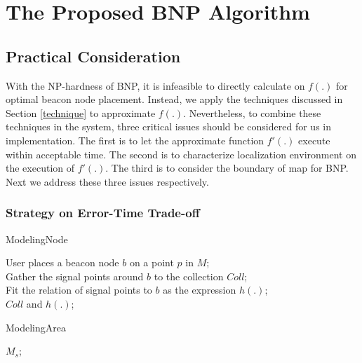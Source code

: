 \documentclass[10pt, conference, letterpaper]{IEEEtran}
\begin{document}
\vspace{0.3ex}

\section{The Proposed BNP Algorithm} \label{synthesize}
\subsection{Practical Consideration} \label{sys_consideration}
With the NP-hardness of BNP, it is infeasible to directly calculate on $f(.)$ for optimal beacon node placement. Instead, we apply the techniques discussed in Section \ref{technique} to approximate $f(.)$. Nevertheless, to combine these techniques in the system, three critical issues should be considered for us in implementation. The first is to let the approximate function $f'(.)$ execute within acceptable time. The second is to characterize localization environment on the execution of $f'(.)$. The third is to consider the boundary of map for BNP. Next we address these three issues respectively.

\subsubsection{Strategy on Error-Time Trade-off}

\begin{algorithm} \label{ModelingNode}
\caption{ModelingNode}
User places a beacon node $b$ on a point $p$ in $M$;\\
Gather the signal points around $b$ to the collection $Coll$;\\
Fit the relation of signal points to $b$ as the expression $h(.)$;\\
\Return $Coll$ and $h(.)$;
\end{algorithm}

\begin{algorithm} \label{ModelingArea}
\caption{ModelingArea}
\Return $M_s$;
\end{algorithm}
\end{document}
